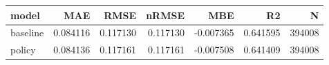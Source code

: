 \begin{tabular}{lrrrrrr}
\toprule
model & MAE & RMSE & nRMSE & MBE & R2 & N \\
\midrule
baseline & 0.084116 & 0.117130 & 0.117130 & -0.007365 & 0.641595 & 394008 \\
policy & 0.084136 & 0.117161 & 0.117161 & -0.007508 & 0.641409 & 394008 \\
\bottomrule
\end{tabular}
